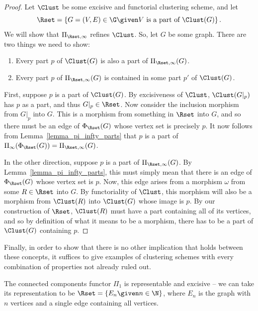 \documentclass[a4paper,reqno,oneside]{article} %
\begin{document}
\begin{proof}
    Let $\Clust$ be some excisive and functorial clustering scheme, and let
    $$\Rset = \left\{G = (V,E) \in \G \given V\text{ is a part of }\Clust(G)\right\}.$$
    We will show that $\Pi_{\Rset,\infty}$ refines $\Clust$. So, let $G$ be some graph. There are two things we need to show:
    \begin{enumerate}
        \item Every part $p$ of $\Clust(G)$ is also a part of $\Pi_{\Rset,\infty}(G)$.
        \item Every part $p$ of $\Pi_{\Rset,\infty}(G)$ is contained in some part $p'$ of $\Clust(G)$.
    \end{enumerate}

    First, suppose $p$ is a part of $\Clust(G)$. By excisiveness of $\Clust$, $\Clust(G|_p)$ has $p$ as a part, and thus $G|_p \in \Rset$. Now consider the inclusion morphism from $G|_p$ into $G$. This is a morphism from something in $\Rset$ into $G$, and so there must be an edge of $\Phi_\Rset(G)$ whose vertex set is precisely $p$. It now follows from Lemma~\ref{lemma_pi_infty_parts} that $p$ is a part of $\Pi_{\infty}(\Phi_\Rset(G)) = \Pi_{\Rset,\infty}(G)$.

    In the other direction, suppose $p$ is a part of $\Pi_{\Rset,\infty}(G)$. By Lemma~\ref{lemma_pi_infty_parts}, this must simply mean that there is an edge of $\Phi_\Rset(G)$ whose vertex set is $p$. Now, this edge arises from a morphism $\omega$ from some $R \in \Rset$ into $G$. By functoriality of $\Clust$, this morphism will also be a morphism from $\Clust(R)$ into $\Clust(G)$ whose image is $p$. By our construction of $\Rset$, $\Clust(R)$ must have a part containing all of its vertices, and so by definition of what it means to be a morphism, there has to be a part of $\Clust(G)$ containing $p$.
\end{proof}

Finally, in order to show that there is no other implication that holds between these concepts, it suffices to give examples of clustering schemes with every combination of properties not already ruled out.

\begin{example}\label{ex_allthreeprops}
    The connected components functor $\Pi_1$ is representable and excisive -- we can take its representation to be $\Rset = \left\{E_n \given n \in \N\right\}$, where $E_n$ is the graph with $n$ vertices and a single edge containing all vertices.
\end{example}
    
\end{document}
